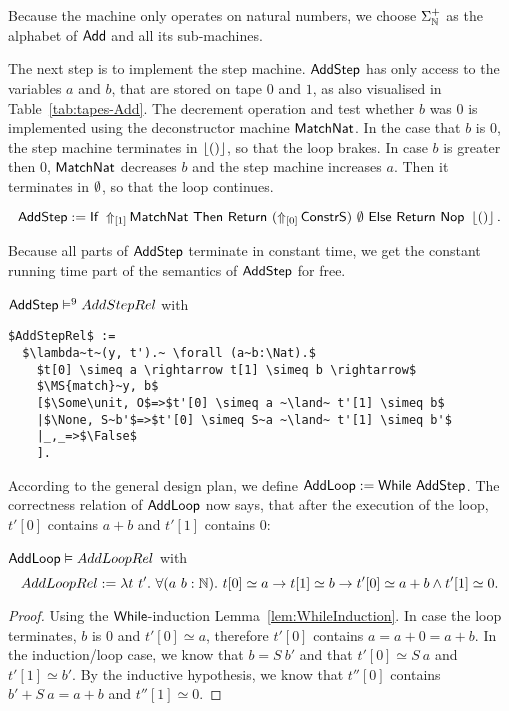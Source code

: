 Because the machine only operates on natural numbers, we choose $\Sigma_\Nat^+$ as the alphabet of $\MS{Add}$ and all its sub-machines.

The next step is to implement the step machine.  $\MS{AddStep}$ has only access to the variables $a$ and $b$, that are stored on tape $0$ and $1$, as
also visualised in Table~\ref{tab:tapes-Add}.  The decrement operation and test whether $b$ was $0$ is implemented using the deconstructor machine
$\MS{MatchNat}$.  In the case that $b$ is $0$, the step machine terminates in $\Some\unit$, so that the loop brakes.  In case $b$ is greater then $0$,
$\MS{MatchNat}$ decreases $b$ and the step machine increases $a$.  Then it terminates in $\None$, so that the loop continues.
\begin{definition}
  \label{def:Add_Step}
  \[
    \MS{AddStep} := \If{\LiftTapes{\MS{MatchNat}}{\Vector{1}}}{\Return{(\LiftTapes{\MS{ConstrS}}{\Vector{0}})}{\None}}{\Return{\Nop}{\Some\unit}}.
  \]
\end{definition}

Because all parts of $\MS{AddStep}$ terminate in constant time, we get the constant running time part of the semantics of $\MS{AddStep}$ for free.
\begin{lemma}
  \label{lem:Add_Step_Sem}
  $\MS{AddStep} \RealiseIn{9} AddStepRel$ with
\begin{lstlisting}[style=semicoqstyle]
$AddStepRel$ :=
  $\lambda~t~(y, t').~ \forall (a~b:\Nat).$
    $t[0] \simeq a \rightarrow t[1] \simeq b \rightarrow$
    $\MS{match}~y, b$
    [$\Some\unit, O$=>$t'[0] \simeq a ~\land~ t'[1] \simeq b$
    |$\None, S~b'$=>$t'[0] \simeq S~a ~\land~ t'[1] \simeq b'$
    |_,_=>$\False$
    ].
\end{lstlisting}
\end{lemma}

According to the general design plan, we define $\MS{AddLoop} := \While~\MS{AddStep}$.  The correctness relation of $\MS{AddLoop}$ now says, that
after the execution of the loop, $t'[0]$ contains $a+b$ and $t'[1]$ contains $0$:
\begin{lemma}
  \label{lem:Add_Loop_Realise}
  $\MS{AddLoop} \Realise AddLoopRel$ with
  \[
    AddLoopRel := \lambda t~t'.~\forall (a~b:\Nat).~t[0] \simeq a \rightarrow t[1] \simeq b \rightarrow t'[0] \simeq a+b \land t'[1] \simeq 0.
  \]
\end{lemma}
\begin{proof}
  Using the $\While$-induction Lemma~\ref{lem:WhileInduction}.  In case the loop terminates, $b$ is $0$ and $t'[0] \simeq a$, therefore $t'[0]$
  contains $a=a+0=a+b$.  In the induction/loop case, we know that $b=S~b'$ and that $t'[0] \simeq S~a$ and $t'[1] \simeq b'$.  By the inductive
  hypothesis, we know that $t''[0]$ contains $b' + S~a = a+b$ and $t''[1] \simeq 0$.
\end{proof}

